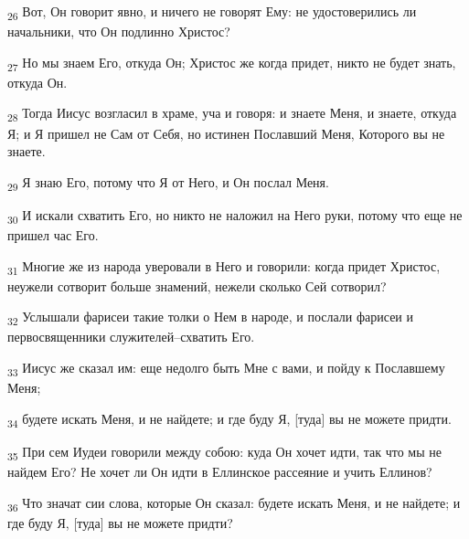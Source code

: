 \begin{tcolorbox}
\textsubscript{26} Вот, Он говорит явно, и ничего не говорят Ему: не удостоверились ли начальники, что Он подлинно Христос?
\end{tcolorbox}
\begin{tcolorbox}
\textsubscript{27} Но мы знаем Его, откуда Он; Христос же когда придет, никто не будет знать, откуда Он.
\end{tcolorbox}
\begin{tcolorbox}
\textsubscript{28} Тогда Иисус возгласил в храме, уча и говоря: и знаете Меня, и знаете, откуда Я; и Я пришел не Сам от Себя, но истинен Пославший Меня, Которого вы не знаете.
\end{tcolorbox}
\begin{tcolorbox}
\textsubscript{29} Я знаю Его, потому что Я от Него, и Он послал Меня.
\end{tcolorbox}
\begin{tcolorbox}
\textsubscript{30} И искали схватить Его, но никто не наложил на Него руки, потому что еще не пришел час Его.
\end{tcolorbox}
\begin{tcolorbox}
\textsubscript{31} Многие же из народа уверовали в Него и говорили: когда придет Христос, неужели сотворит больше знамений, нежели сколько Сей сотворил?
\end{tcolorbox}
\begin{tcolorbox}
\textsubscript{32} Услышали фарисеи такие толки о Нем в народе, и послали фарисеи и первосвященники служителей--схватить Его.
\end{tcolorbox}
\begin{tcolorbox}
\textsubscript{33} Иисус же сказал им: еще недолго быть Мне с вами, и пойду к Пославшему Меня;
\end{tcolorbox}
\begin{tcolorbox}
\textsubscript{34} будете искать Меня, и не найдете; и где буду Я, [туда] вы не можете придти.
\end{tcolorbox}
\begin{tcolorbox}
\textsubscript{35} При сем Иудеи говорили между собою: куда Он хочет идти, так что мы не найдем Его? Не хочет ли Он идти в Еллинское рассеяние и учить Еллинов?
\end{tcolorbox}
\begin{tcolorbox}
\textsubscript{36} Что значат сии слова, которые Он сказал: будете искать Меня, и не найдете; и где буду Я, [туда] вы не можете придти?
\end{tcolorbox}
